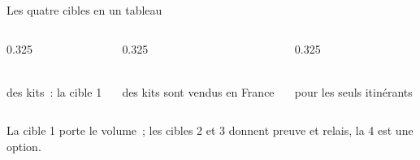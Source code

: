 \begin{frame}{Les quatre cibles en un tableau}
  \begin{columns}[T]
    \begin{column}{0.325\textwidth}
      \begin{carte}[height=0.95cm,valign=top,colback=insarose]
        \raggedright{}\\[1pt]{\footnotesize des kits~: la cible 1}
      \end{carte}
    \end{column}
    \begin{column}{0.325\textwidth}
      \begin{carte}[height=0.95cm,valign=top]
        \raggedright{}\\[1pt]{\footnotesize des kits sont vendus en France}
      \end{carte}
    \end{column}
    \begin{column}{0.325\textwidth}
      \begin{carte}[height=0.95cm,valign=top]
        \raggedright{}\\[1pt]{\footnotesize pour les seuls itinérants}
      \end{carte}
    \end{column}
  \end{columns}
  \vspace{0.08cm}
  \begin{pcompact}\centering\footnotesize
    La cible 1 porte le volume~; les cibles 2 et 3 donnent preuve et relais, la 4 est une option.
  \end{pcompact}
\end{frame}

\newcommand{\mkcell}[4]{%
  \pgfmathtruncatemacro{\mksh}{min(100,round(6+2.4*100*(#3)/\mkr{kits.total.central}))}%
  \fill[insarouge!\mksh] (#1,#2) rectangle ++(2.3,0.5);%
  \node[font=\footnotesize\bfseries,inner sep=0pt] at ({#1+1.15},{#2+0.25}) {\ifnum\mksh>52 \color{white}\fi #4};}

